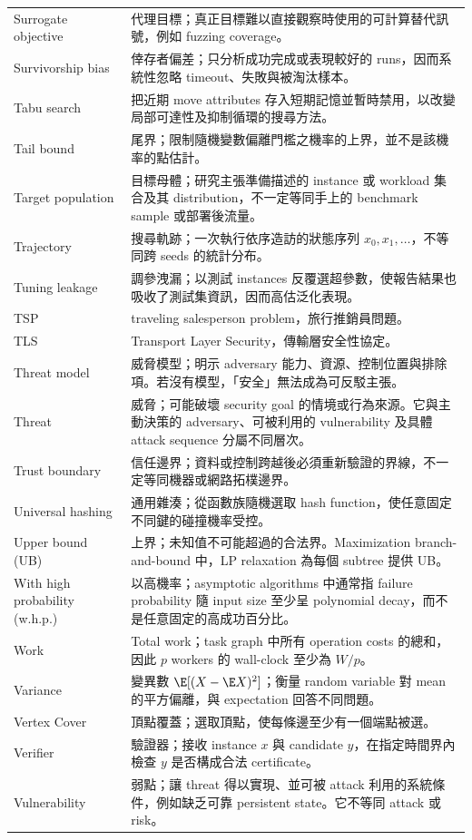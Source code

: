 \documentclass[11pt,a4paper,oneside,openany]{book}
\begin{document}
\begin{longtable}{@{}>{\raggedright\arraybackslash}p{}p{}@{}}
Surrogate objective & 代理目標；真正目標難以直接觀察時使用的可計算替代訊號，例如 fuzzing coverage。 \\
Survivorship bias & 倖存者偏差；只分析成功完成或表現較好的 runs，因而系統性忽略 timeout、失敗與被淘汰樣本。 \\
Tabu search & 把近期 move attributes 存入短期記憶並暫時禁用，以改變局部可達性及抑制循環的搜尋方法。 \\
Tail bound & 尾界；限制隨機變數偏離門檻之機率的上界，並不是該機率的點估計。 \\
Target population & 目標母體；研究主張準備描述的 instance 或 workload 集合及其 distribution，不一定等同手上的 benchmark sample 或部署後流量。 \\
Trajectory & 搜尋軌跡；一次執行依序造訪的狀態序列 $x_0,x_1,\ldots$，不等同跨 seeds 的統計分布。 \\
Tuning leakage & 調參洩漏；以測試 instances 反覆選超參數，使報告結果也吸收了測試集資訊，因而高估泛化表現。 \\
TSP & traveling salesperson problem，旅行推銷員問題。 \\
TLS & Transport Layer Security，傳輸層安全性協定。 \\
Threat model & 威脅模型；明示 adversary 能力、資源、控制位置與排除項。若沒有模型，「安全」無法成為可反駁主張。 \\
Threat & 威脅；可能破壞 security goal 的情境或行為來源。它與主動決策的 adversary、可被利用的 vulnerability 及具體 attack sequence 分屬不同層次。 \\
Trust boundary & 信任邊界；資料或控制跨越後必須重新驗證的界線，不一定等同機器或網路拓樸邊界。 \\
Universal hashing & 通用雜湊；從函數族隨機選取 hash function，使任意固定不同鍵的碰撞機率受控。 \\
Upper bound (UB) & 上界；未知值不可能超過的合法界。Maximization branch-and-bound 中，LP relaxation 為每個 subtree 提供 UB。 \\
With high probability (w.h.p.) & 以高機率；asymptotic algorithms 中通常指 failure probability 隨 input size 至少呈 polynomial decay，而不是任意固定的高成功百分比。 \\
Work & Total work；task graph 中所有 operation costs 的總和，因此 $p$ workers 的 wall-clock 至少為 $W/p$。 \\
Variance & 變異數 $\E[(X-\E X)^2]$；衡量 random variable 對 mean 的平方偏離，與 expectation 回答不同問題。 \\
Vertex Cover & 頂點覆蓋；選取頂點，使每條邊至少有一個端點被選。 \\
Verifier & 驗證器；接收 instance $x$ 與 candidate $y$，在指定時間界內檢查 $y$ 是否構成合法 certificate。 \\
Vulnerability & 弱點；讓 threat 得以實現、並可被 attack 利用的系統條件，例如缺乏可靠 persistent state。它不等同 attack 或 risk。 \\
\bottomrule
\end{longtable}
\end{document}
